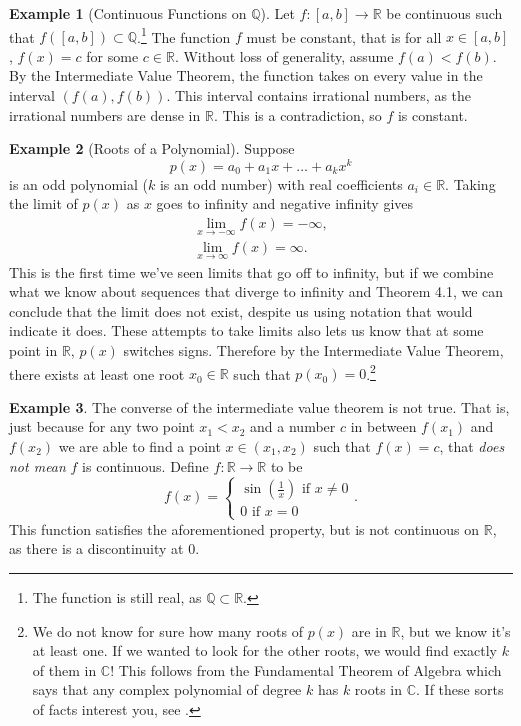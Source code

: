 \documentclass{article}
\newcommand{\R}{\mathbb{R}}
\newcommand{\Q}{\mathbb{Q}}
\theoremstyle{definition}
\newtheorem{example}{Example}[section]
\begin{document}
	\begin{example}[Continuous Functions on $ \Q $]
		Let $ f:[a,b]\to\R $ be continuous such that $ f([a,b])\subset\Q $.\footnote{The function is still real, as $ \Q\subset\R $.} The function $ f $ must be constant, that is for all $ x\in[a,b] $, $ f(x)=c $ for some $ c\in\R $. Without loss of generality, assume $ f(a)<f(b) $. By the Intermediate Value Theorem, the function takes on every value in the interval $ (f(a),f(b)) $. This interval contains irrational numbers, as the irrational numbers are dense in $ \R $. This is a contradiction, so $ f $ is constant.   
	\end{example}
	\begin{example}[Roots of a Polynomial]
		Suppose $$ p(x)=a_0+a_1x+\ldots+a_kx^k $$ is an odd polynomial ($ k $ is an odd number) with real coefficients $ a_i\in\R $. Taking the limit of $ p(x) $ as $ x $ goes to infinity and negative infinity gives \begin{align*}
			\lim\limits_{x\to-\infty}f(x)=-\infty,\\
			\lim\limits_{x\to\infty}f(x)=\infty.
		\end{align*}
		This is the first time we've seen limits that go off to infinity, but if we combine what we know about sequences that diverge to infinity and Theorem 4.1, we can conclude that the limit does not exist, despite us using notation that would indicate it does. These attempts to take limits also lets us know that at some point in $ \R $, $ p(x) $ switches signs. Therefore by the Intermediate Value Theorem, there exists at least one root $ x_0\in\R $ such that $ p(x_0)=0 $.\footnote{We do not know for sure how many roots of $ p(x) $ are in $ \R $, but we know it's at least one. If we wanted to look for the other roots, we would find exactly $ k $ of them in $ \mathbb{C} $! This follows from the Fundamental Theorem of Algebra which says that any complex polynomial of degree $ k $ has $ k $ roots in $ \mathbb{C} $. If these sorts of facts interest you, see \cite{dummit2004abstract}.} 
	\end{example}
	\begin{example}
		The converse of the intermediate value theorem is not true. That is, just because for any two point $ x_1<x_2 $ and a number $ c $ in between $ f(x_1) $ and $ f(x_2) $ we are able to find a point $ x\in(x_1,x_2) $ such that $ f(x)=c $, that \textit{does not mean} $ f $ is continuous. Define $ f:\R\to\R $ to be $$f(x)=\begin{cases}
			\sin\left(\frac{1}{x}\right)\text{ if }x\neq 0\\
			0\text{ if }x=0
		\end{cases} .$$ This function satisfies the aforementioned property, but is not continuous on $ \R $, as there is a discontinuity at $ 0 $. 
	\end{example}
\end{document}
